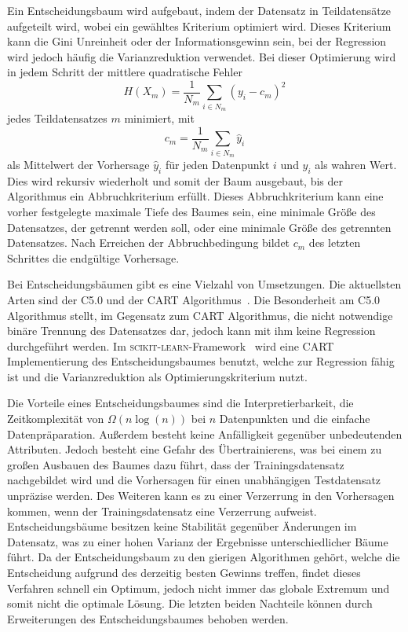 Ein Entscheidungsbaum wird aufgebaut, indem der Datensatz in Teildatensätze aufgeteilt wird, wobei ein gewähltes Kriterium optimiert wird.
Dieses Kriterium
kann die Gini Unreinheit oder der Informationsgewinn sein, bei der Regression wird jedoch häufig die Varianzreduktion verwendet.
Bei dieser Optimierung wird in jedem Schritt der mittlere quadratische Fehler
\begin{equation}
  H(X_m) = \frac{1}{N_m}\sum_{i\in N_m}(y_i-c_m)^2
\end{equation}
jedes Teildatensatzes $m$ minimiert, mit
\begin{equation}
  c_m = \frac{1}{N_m}\sum_{i\in N_m}\hat{y}_i
\end{equation}
als Mittelwert der Vorhersage $\hat{y}_i$ für jeden Datenpunkt $i$ und $y_i$ als wahren Wert.
Dies wird rekursiv wiederholt und somit der Baum ausgebaut, bis der Algorithmus ein Abbruchkriterium erfüllt.
Dieses Abbruchkriterium kann eine vorher festgelegte maximale Tiefe
des Baumes sein, eine minimale Größe des Datensatzes, der getrennt werden soll, oder eine minimale Größe des getrennten Datensatzes. Nach Erreichen der Abbruchbedingung bildet
$c_m$ des letzten Schrittes die endgültige Vorhersage.

Bei Entscheidungsbäumen gibt es eine Vielzahl von Umsetzungen.
Die aktuellsten Arten sind der C5.0 und der CART Algorithmus~\cite[1]{CART}.
Die Besonderheit am C5.0 Algorithmus stellt, im Gegensatz zum CART Algorithmus, die nicht notwendige binäre Trennung des Datensatzes dar,
jedoch kann mit ihm keine Regression durchgeführt werden.
Im \textsc{scikit-learn}-Framework~\cite{scikit-learn} wird eine CART Implementierung des Entscheidungsbaumes benutzt, welche zur
Regression fähig ist und die Varianzreduktion als Optimierungskriterium nutzt.

Die Vorteile eines Entscheidungsbaumes sind die Interpretierbarkeit, die Zeitkomplexität von $\Omega(n\log(n))$ bei $n$ Datenpunkten und die einfache Datenpräparation.
Außerdem besteht keine Anfälligkeit gegenüber unbedeutenden Attributen.
Jedoch besteht eine Gefahr des Übertrainierens, was bei einem zu großen Ausbauen des Baumes dazu führt, dass der Trainingsdatensatz nachgebildet
wird und die Vorhersagen für einen unabhängigen Testdatensatz unpräzise werden.
Des Weiteren kann es zu einer Verzerrung in den Vorhersagen kommen, wenn der Trainingsdatensatz eine Verzerrung aufweist.
Entscheidungsbäume besitzen keine Stabilität gegenüber Änderungen im Datensatz, was zu einer hohen Varianz der Ergebnisse
unterschiedlicher Bäume führt.
Da der Entscheidungsbaum zu den gierigen Algorithmen gehört, welche die Entscheidung aufgrund des derzeitig besten Gewinns treffen, findet dieses Verfahren schnell ein
Optimum, jedoch nicht immer das globale Extremum und somit nicht die optimale Lösung.
Die letzten beiden Nachteile können durch Erweiterungen des Entscheidungsbaumes behoben werden.

